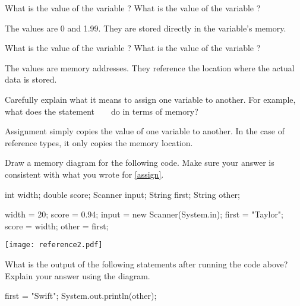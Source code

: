 \Q What is the value of the variable ? What is the value of the variable ?

\begin{answer}[3em]
The values are 0 and 1.99. They are stored directly in the variable's memory.
\end{answer}


\Q \label{varval}
What is the value of the variable ? What is the value of the variable ?

\begin{answer}[3em]
The values are memory addresses. They reference the location where the actual data is stored.
\end{answer}


\Q \label{assign}
Carefully explain what it means to assign one variable to another.
For example, what does the statement ~  ~ do in terms of memory?

\begin{answer}
Assignment simply copies the value of one variable to another.
In the case of reference types, it only copies the memory location.
\end{answer}


\Q \label{twostrs}
Draw a memory diagram for the following code. Make sure your answer is consistent with what you wrote for \ref{assign}.

\begin{multicols}{2}

\begin{javalst}
int width;
double score;
Scanner input;
String first;
String other;

width = 20;
score = 0.94;
input = new Scanner(System.in);
first = "Taylor";
score = width;
other = first;
\end{javalst}

\columnbreak

\begin{answer}[3in]
\texttt{[image: reference2.pdf]}
\end{answer}

\end{multicols}


\Q What is the output of the following statements after running the code above?
Explain your answer using the diagram.

\begin{javalst}
first = "Swift";
System.out.println(other);
\end{javalst}

